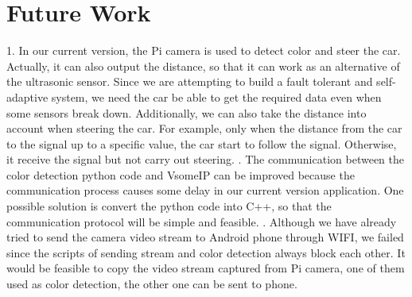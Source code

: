 \documentclass[11pt, titlepage]{article} %
\begin{document}
\section{Future Work}
1.	In our current version, the Pi camera is used to detect color and steer the car. Actually, it can also output the distance, so that it can work as an alternative of the ultrasonic sensor. Since we are attempting to build a fault tolerant and self-adaptive system, we need the car be able to get the required data even when some sensors break down. Additionally, we can also take the distance into account when steering the car. For example, only when the distance from the car to the signal up to a specific value, the car start to follow the signal. Otherwise, it receive the signal but not carry out steering.
.	The communication between the color detection python code and VsomeIP can be improved because the communication process causes some delay in our current version application. One possible solution is convert the python code into C++, so that the communication protocol will be simple and feasible.
.	Although we have already tried to send the camera video stream to Android phone through WIFI, we failed since the scripts of sending stream and color detection always block each other. It would be feasible to copy the video stream captured from Pi camera, one of them used as color detection, the other one can be sent to phone.
\clearpage




\clearpage
\clearpage
\appendix
\clearpage
\end{document}
